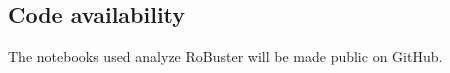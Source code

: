\documentclass[sn-mathphys,Numbered]{sn-jnl}%
\theoremstyle{thmstyleone}%
\theoremstyle{thmstyletwo}%
\theoremstyle{thmstylethree}%
\begin{document}
\subsection*{Code availability}
%
The notebooks used analyze RoBuster will be made public on GitHub.
%
%
%
%
%
%
%
%
%
%
%
%
%
%
%


\end{document}
